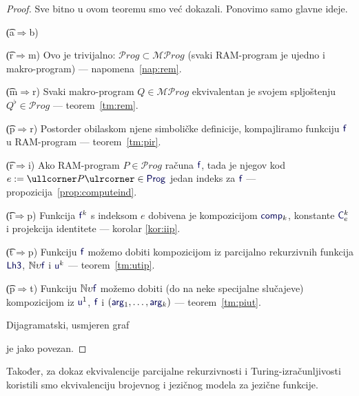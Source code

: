 \begin{proof}
Sve bitno u ovom teoremu smo već dokazali. Ponovimo samo glavne ideje.

\begin{labeling}{\t{(a$\Rightarrow$b)}}
    \item[\t{(r$\Rightarrow$m)}] Ovo je trivijalno: $\mathcal Prog\subset\mathcal{MP}rog$ (svaki RAM-program je ujedno i makro-program) --- napomena~\ref{nap:rem}.
    \item[\t{(m$\Rightarrow$r)}] Svaki makro-program $Q\in\mathcal{MP}rog$ ekvivalentan je svojem spljoštenju $Q^\flat\in\mathcal Prog$ --- teorem~\ref{tm:rem}.
    \item[\t{(p$\Rightarrow$r)}] Postorder obilaskom njene simboličke definicije, kompajliramo funkciju $\f f$ u RAM-program --- teorem~\ref{tm:pir}.
    \item[\t{(r$\Rightarrow$i)}] Ako RAM-program $P\in\mathcal Prog$ računa $\f f$, tada je njegov kod $e:=\kprog P\in\f{Prog}$ jedan indeks za $ \f f$ --- propozicija~\ref{prop:computeind}.
    \item[\t{(i$\Rightarrow$p)}] Funkcija $\f f^k$ s indeksom $e$ dobivena je kompozicijom $\f{comp}_k$, konstante $\f C_e^k$ i projekcija identitete --- korolar \ref{kor:iip}.
    \item[\t{(t$\Rightarrow$p)}] Funkciju $\f f$ možemo dobiti kompozicijom iz parcijalno rekurzivnih funkcija $\f{Lh3}$, $\N\upsilon\f f$ i $\f u^k$ --- teorem~\ref{tm:utip}.
    \item[\t{(p$\Rightarrow$t)}] Funkciju $\N\upsilon\f f$ možemo dobiti (do na neke specijalne slučajeve) kompozicijom iz $\f u^1$, $\f f$ i $(\f{arg}_1,\dotsc,\f{arg}_k)$ --- teorem~\ref{tm:piut}.
\end{labeling}
Dijagramatski, usmjeren graf
 je jako povezan.
\end{proof}

Također, za dokaz ekvivalencije parcijalne rekurzivnosti i Turing-izračunljivosti koristili smo ekvivalenciju brojevnog i jezičnog modela za jezične funkcije.

